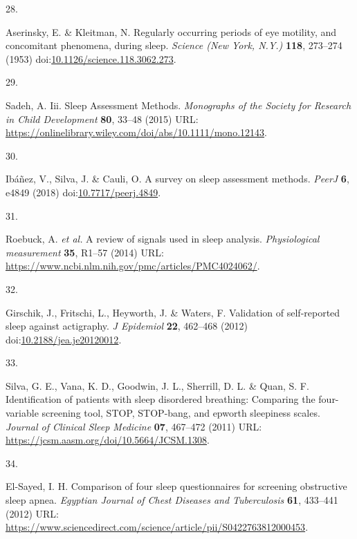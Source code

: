 \documentclass[
  9pt,
]{scrbook}
\newlength{\cslhangindent}
\newlength{\csllabelwidth}
\newlength{\cslentryspacingunit} %
\newenvironment{CSLReferences}[2] %
 {%
  \setlength{\parindent}{0pt}
  \ifodd #1
  \let\oldpar\par
  \def\par{\hangindent=\cslhangindent\oldpar}
  \fi
  \setlength{\parskip}{#2\cslentryspacingunit}
 }%
 {}
\newcommand{\CSLLeftMargin}[1]{\parbox[t]{\csllabelwidth}{#1}}
\newcommand{\CSLRightInline}[1]{\parbox[t]{\linewidth - \csllabelwidth}{#1}\break}
\begin{document}
\begin{CSLReferences}{0}{0}
\leavevmode{}%
\CSLLeftMargin{28. }%
\CSLRightInline{Aserinsky, E. \& Kleitman, N. Regularly occurring
periods of eye motility, and concomitant phenomena, during sleep.
\emph{Science (New York, N.Y.)} \textbf{118}, 273--274 (1953)
doi:\href{https://doi.org/10.1126/science.118.3062.273}{10.1126/science.118.3062.273}.}

\leavevmode{}%
\CSLLeftMargin{29. }%
\CSLRightInline{Sadeh, A. Iii. Sleep Assessment Methods.
\emph{Monographs of the Society for Research in Child Development}
\textbf{80}, 33--48 (2015) URL:
\url{https://onlinelibrary.wiley.com/doi/abs/10.1111/mono.12143}.}

\leavevmode{}%
\CSLLeftMargin{30. }%
\CSLRightInline{Ibáñez, V., Silva, J. \& Cauli, O. A survey on sleep
assessment methods. \emph{PeerJ} \textbf{6}, e4849 (2018)
doi:\href{https://doi.org/10.7717/peerj.4849}{10.7717/peerj.4849}.}

\leavevmode{}%
\CSLLeftMargin{31. }%
\CSLRightInline{Roebuck, A. \emph{et al.} A review of signals used in
sleep analysis. \emph{Physiological measurement} \textbf{35}, R1--57
(2014) URL:
\url{https://www.ncbi.nlm.nih.gov/pmc/articles/PMC4024062/}.}

\leavevmode{}%
\CSLLeftMargin{32. }%
\CSLRightInline{Girschik, J., Fritschi, L., Heyworth, J. \& Waters, F.
Validation of self-reported sleep against actigraphy. \emph{J Epidemiol}
\textbf{22}, 462--468 (2012)
doi:\href{https://doi.org/10.2188/jea.je20120012}{10.2188/jea.je20120012}.}

\leavevmode{}%
\CSLLeftMargin{33. }%
\CSLRightInline{Silva, G. E., Vana, K. D., Goodwin, J. L., Sherrill, D.
L. \& Quan, S. F. Identification of patients with sleep disordered
breathing: Comparing the four-variable screening tool, STOP, STOP-bang,
and epworth sleepiness scales. \emph{Journal of Clinical Sleep Medicine}
\textbf{07}, 467--472 (2011) URL:
\url{https://jcsm.aasm.org/doi/10.5664/JCSM.1308}.}

\leavevmode{}%
\CSLLeftMargin{34. }%
\CSLRightInline{El-Sayed, I. H. Comparison of four sleep questionnaires
for screening obstructive sleep apnea. \emph{Egyptian Journal of Chest
Diseases and Tuberculosis} \textbf{61}, 433--441 (2012) URL:
\url{https://www.sciencedirect.com/science/article/pii/S0422763812000453}.}


\end{CSLReferences}
\end{document}
